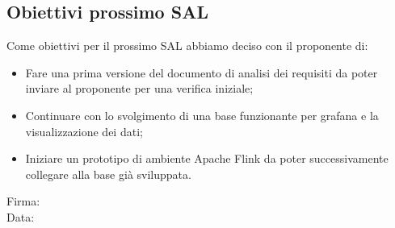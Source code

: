 \documentclass[12pt]{article}
\begin{document}
\subsection{Obiettivi prossimo SAL}
Come obiettivi per il prossimo SAL abbiamo deciso con il proponente di:
\begin{itemize}
\item Fare una prima versione del documento di analisi dei requisiti da poter inviare al proponente per una verifica iniziale;
\item Continuare con lo svolgimento di una base funzionante per grafana e la visualizzazione dei dati;
\item Iniziare un prototipo di ambiente Apache Flink da poter successivamente collegare alla base già sviluppata.
\end{itemize}

\vfill
\begin{minipage}{10cm}
Firma: \hrulefill \\
\vspace{2mm}
Data: \dotfill
\end{minipage}
\end{document}
